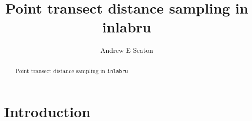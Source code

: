 \documentclass[preprint,12pt]{elsarticle}
\begin{document}
\begin{frontmatter}
\title{Point transect distance sampling in inlabru}




\author{Andrew E Seaton}

\address{Centre for Research into Ecological \& Environmental Modelling and School of Mathematics \& Statistics, University of St Andrews, St Andrews, Fife, Scotland}

\begin{abstract}
Point transect distance sampling in \texttt{inlabru}
\end{abstract}

\end{frontmatter}

\section*{Introduction}
\end{document}
